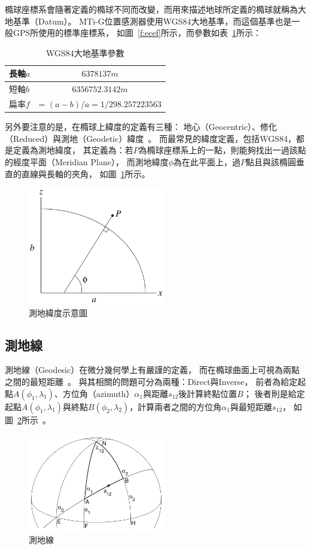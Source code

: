 橢球座標系會隨著定義的橢球不同而改變，而用來描述地球所定義的橢球就稱為大地基準（Datum）。
MTi-G位置感測器使用WGS84大地基準，而這個基準也是一般GPS所使用的標準座標系，
如圖~\ref{f:ecef}所示，而參數如表~\ref{t:wgs84}所示：
\begin{table}[h!]
	\centering
	\caption{WGS84大地基準參數}
	\label{t:wgs84}
	\begin{tabular}{ | l | c | }
		\hline
		長軸$a$ & $6378137m$ \\ \hline
		短軸$b$ & $6356752.3142m$ \\ \hline
		扁率$f$	& = $(a-b) / a = 1/298.257223563$ \\
		\hline
	\end{tabular}
\end{table}

另外要注意的是，在橢球上緯度的定義有三種：
地心（Geocentric）、修化（Reduced）與測地（Geodetic）緯度~\cite{Jekeli:2006:GRSinGeodesy}。
而最常見的緯度定義，包括WGS84，都是定義為測地緯度，
其定義為：若$P$為橢球座標系上的一點，則能夠找出一過該點的經度平面（Meridian Plane），
而測地緯度$\phi$為在此平面上，過$P$點且與該橢圓垂直的直線與長軸的夾角，
如圖~\ref{f:geodetic_latitude}所示。
\begin{figure}[h!]
	\centering
	\includegraphics[width=6cm]{figures/geodetic_latitude}
	\caption{測地緯度示意圖}
	\label{f:geodetic_latitude}
\end{figure}

\subsection{測地線}
測地線（Geodesic）在微分幾何學上有嚴謹的定義，
而在橢球曲面上可視為兩點之間的最短距離~\cite{Karney:2013:Algorithms_for_Geodesics}。
與其相關的問題可分為兩種：Direct與Inverse，
前者為給定起點$A(\phi_1,\lambda_1)$、方位角（azimuth）$\alpha_1$與距離$s_{12}$後計算終點位置$B$；
後者則是給定起點$A(\phi_1,\lambda_1)$與終點$B(\phi_2,\lambda_2)$，計算兩者之間的方位角$\alpha_1$與最短距離$s_{12}$，
如圖~\ref{f:geodesic}所示~\cite{Jekeli:2006:GRSinGeodesy}。
\begin{figure}[h!]
	\centering
	\includegraphics[width=6cm]{figures/geodesic}
	\caption{測地線}
	\label{f:geodesic}
\end{figure}


